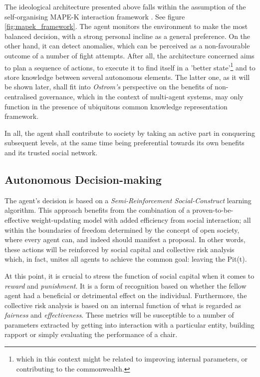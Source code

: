         The ideological architecture presented above falls within the assumption of the self-organising MAPE-K interaction framework \cite{mapek}. See figure \ref{fig:mapek_framework}. The agent monitors the environment to make the most balanced decision, with a strong personal incline as a general preference. On the other hand, it can detect anomalies, which can be perceived as a non-favourable outcome of a number of fight attempts. After all, the architecture concerned aims to plan a sequence of actions, to execute it to find itself in a 'better state'\footnote{which in this context might be related to improving internal parameters, or contributing to the commonwealth.} and to store knowledge between several autonomous elements. The latter one, as it will be shown later, shall fit into \textit{Ostrom's} perspective on the benefits of non-centralised governance, which in the context of multi-agent systems, may only function in the presence of ubiquitous common knowledge representation framework.

        In all, the agent shall contribute to society by taking an active part in conquering subsequent levels, at the same time being preferential towards its own benefits and its trusted social network.
        
        
    \subsection{Autonomous Decision-making}

        The agent's decision is based on a \textit{Semi-Reinforcement Social-Construct} learning algorithm. This approach benefits from the combination of a proven-to-be-effective weight-updating model with added efficiency from social interaction; all within the boundaries of freedom determined by the concept of open society, where every agent can, and indeed should manifest a proposal. In other words, these actions will be reinforced by social capital and collective risk analysis which, in fact, unites all agents to achieve the common goal: leaving the Pit(t).
        
        At this point, it is crucial to stress the function of social capital when it comes to \textit{reward} and \textit{punishment}. It is a form of recognition based on whether the fellow agent had a beneficial or detrimental effect on the individual. Furthermore, the collective risk analysis is based on an internal function of what is regarded as \textit{fairness} and \textit{effectiveness}. These metrics will be susceptible to a number of parameters extracted by getting into interaction with a particular entity, building rapport or simply evaluating the performance of a chair.
        
